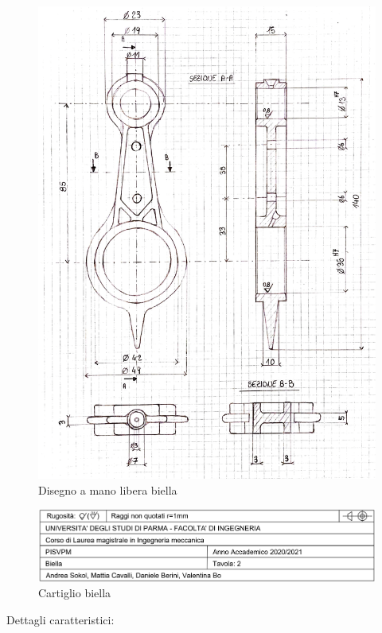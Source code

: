 \begin{figure}[h]
    \centering
    \includegraphics[scale=0.4]{Immagini/SchizzoBiella.png}
    \caption{Disegno a mano libera biella}
    \label{fig:SchizzoBiella}
\end{figure}
\begin{figure}[h!]
    \centering
    \includegraphics[scale=0.5]{Immagini/CartiglioBiella.png}
    \caption{Cartiglio biella}
    \label{fig:CartiglioBiella}
\end{figure}
\newpage
Dettagli caratteristici:

